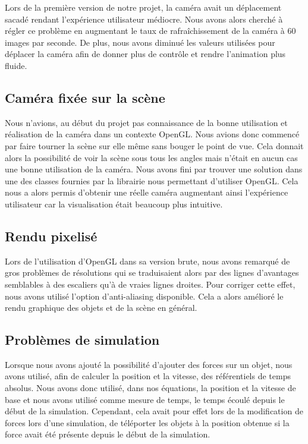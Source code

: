 \documentclass[11pt]{report}
\begin{document}
Lors de la première version de notre projet, la caméra avait un déplacement sacadé rendant l'expérience utilisateur médiocre. Nous avons alors
cherché à régler ce problème en augmentant le taux de rafraîchissement de la caméra à 60 images par seconde. De plus, nous avons diminué
les valeurs utilisées pour déplacer la caméra afin de donner plus de contrôle et rendre l'animation plus fluide.

\subsection{Caméra fixée sur la scène}

Nous n'avions, au début du projet pas connaissance de la bonne utilisation et réalisation de la caméra dans un contexte OpenGL. Nous avions
donc commencé par faire tourner la scène sur elle même sans bouger le point de vue. Cela donnait alors la possibilité de voir la scène sous tous les angles mais n'était en aucun cas une bonne utilisation de la caméra. Nous avons fini par trouver une solution dans une des classes fournies par la librairie nous permettant d'utiliser OpenGL. Cela nous a alors permis d'obtenir une réelle caméra augmentant ainsi l'expérience utilisateur car la visualisation était beaucoup plus intuitive.

\newpage

\subsection{Rendu pixelisé}


Lors de l'utilisation d'OpenGL dans sa version brute, nous avons remarqué de gros problèmes de résolutions qui se traduisaient alors
par des lignes d'avantages semblables à des escaliers qu'à de vraies lignes droites. Pour corriger cette effet, nous avons utilisé l'option
d'anti-aliasing disponible. Cela a alors amélioré le rendu graphique des objets et de la scène en général.

\subsection{Problèmes de simulation}

Lorsque nous avons ajouté la possibilité d'ajouter des forces sur un objet, nous avons utilisé, afin de calculer la position et la vitesse, des
référentiels de temps absolus. Nous avons donc utilisé, dans nos équations, la position et la vitesse de base et nous avons utilisé comme mesure
de temps, le temps écoulé depuis le début de la simulation. Cependant, cela avait pour effet lors de la modification de forces lors d'une
simulation, de téléporter les objets à la position obtenue si la force avait été présente depuis le début de la simulation.
\end{document}
